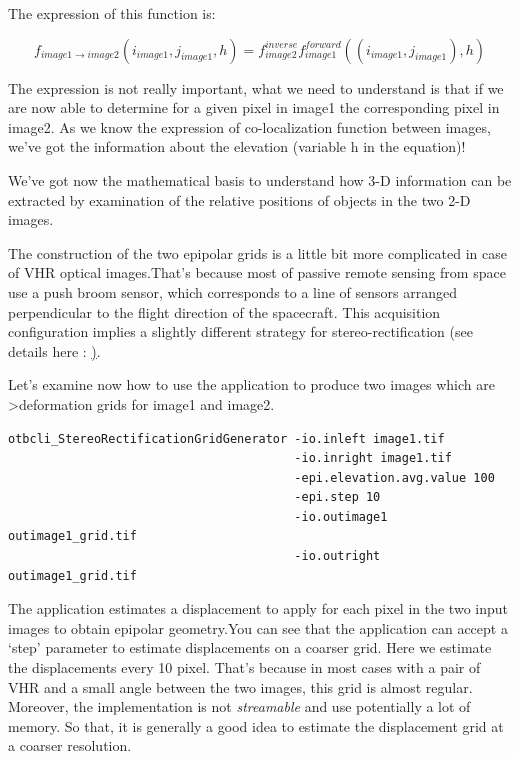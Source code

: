 The expression of this function is:

\begin{equation}
f_{image1 \rightarrow image2} (i_{image1} , j_{image1} , h) =  f^{inverse}_{image2} f^{forward}_{image1}((i_{image1} , j_{image1}), h)
\end{equation}

The expression is not really important, what we need to understand is that if we
are now able to determine for a given pixel in image1 the corresponding pixel in
image2.  As we know the expression of co-localization function between images,
we've got the information about the elevation (variable h in the equation)!

We've got now the mathematical basis to understand how 3-D information can be
extracted by examination of the relative positions of objects in the two 2-D
images.

The construction of the two epipolar grids is a little bit more complicated in
case of VHR optical images.That's because most of passive remote sensing from
space use a push broom sensor, which corresponds to a line of sensors arranged
perpendicular to the flight direction of the spacecraft. This acquisition
configuration implies a slightly different strategy for stereo-rectification
(see details here :
\href{http://en.wikipedia.org/wiki/Epipolar_geometry#Epipolar_geometry_of_pushbroom_sensor}).

Let's examine now how to use the 
application to produce two images which are \textgreater{deformation grids} for
image1 and image2.

\begin{verbatim}
otbcli_StereoRectificationGridGenerator -io.inleft image1.tif
                                        -io.inright image1.tif
                                        -epi.elevation.avg.value 100
                                        -epi.step 10
                                        -io.outimage1 outimage1_grid.tif
                                        -io.outright outimage1_grid.tif
\end{verbatim}

The application estimates a displacement to apply for each pixel in the two
input images to obtain epipolar geometry.You can see that the application can
accept a `step' parameter to estimate displacements on a coarser grid. Here we
estimate the displacements every 10 pixel. That's because in most cases with a
pair of VHR and a small angle between the two images, this grid is almost
regular.  Moreover, the implementation is not \textit{streamable} and use potentially a
lot of memory. So that, it is generally a good idea to estimate the displacement
grid at a coarser resolution.

